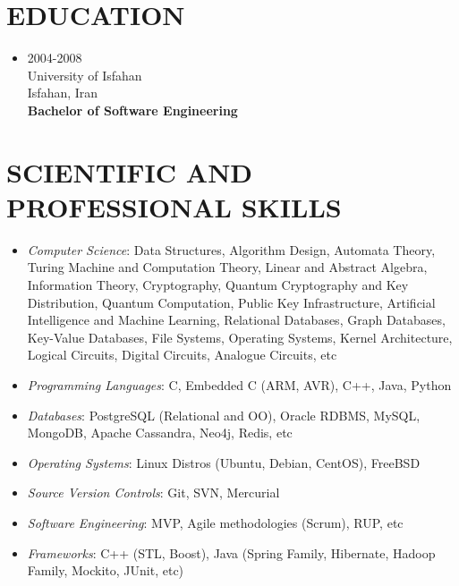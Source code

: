 \documentclass[10pt,a4paper]{article}
\begin{document}

\section{EDUCATION}

  \begin{itemize}
    \item \small {2004-2008 \\
                  University of Isfahan \\
                  Isfahan, Iran \\
                  \textbf{Bachelor of Software Engineering}}
  \end{itemize}



\section{SCIENTIFIC AND PROFESSIONAL SKILLS}
\begin{itemize}
  \setlength{\rightskip}{2cm}
  \setlength\itemsep{0em}
  \item \small \textit {Computer Science}:
  Data Structures, Algorithm Design, Automata Theory, Turing Machine and Computation Theory, Linear and Abstract Algebra, Information Theory, Cryptography, Quantum Cryptography and Key Distribution, Quantum Computation, Public Key Infrastructure, Artificial Intelligence and Machine Learning,  Relational Databases, Graph Databases, Key-Value Databases, File Systems, Operating Systems, Kernel Architecture, Logical Circuits, Digital Circuits, Analogue Circuits, etc
  \item \small \textit {Programming Languages}: C, Embedded C (ARM, AVR), C++, Java, Python
  \item \small \textit {Databases}: PostgreSQL (Relational and OO), Oracle RDBMS, MySQL, MongoDB, Apache Cassandra, Neo4j, Redis, etc
  \item \small \textit {Operating Systems}: Linux Distros (Ubuntu, Debian, CentOS), FreeBSD
  \item \small \textit {Source Version Controls}: Git, SVN, Mercurial
  \item \small \textit {Software Engineering}: MVP, Agile methodologies (Scrum), RUP, etc
  \item \small \textit {Frameworks}: C++ (STL, Boost), Java (Spring Family, Hibernate, Hadoop Family, Mockito, JUnit, etc)
\end{itemize}
\end{document}
